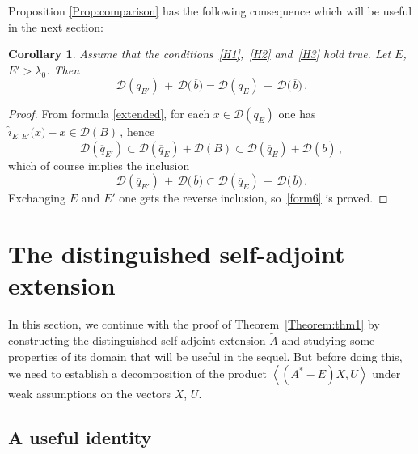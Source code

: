 \documentclass[12pt,reqno]{amsart}
\newtheorem{corollary}[theorem]{Corollary}\newtheorem{remark}[theorem]{Remark}
\newcommand{\innerproduct}[2]{\left\langle #1, #2 \right\rangle}
\newcommand{\be}[1]{\begin{equation}\label{#1}}
\newcommand{\ee}{\end{equation}}
\renewcommand{\(}{\left(}
\renewcommand{\)}{\right)}
\begin{document}
\noindent Proposition \ref{Prop:comparison} has the following consequence which will be useful in the next section:
\begin{corollary}\label{invariance}
Assume that the conditions~\eqref{H1},~\eqref{H2} and~\eqref{H3} hold true. Let $E$, $E'>\lambda_0$. Then
\be{form6}
\mathcal D(\overline{q}_{E'})\,+\, \mathcal D\big(\,\overline{b}\big) = \mathcal D(\overline{q}_E)\,+\, \mathcal D\big(\,\overline{b}\big)\,.
\ee
\end{corollary}
\begin{proof}

From formula \eqref{extended}, for each $x\in \mathcal D(\overline{q}_{E})$ one has $\hat{i}_{E,E'}\big(x) - x \in \mathcal D(B)\,$, hence
\[\mathcal D(\overline{q}_{E'})\subset
\mathcal D(\overline{q}_{E})+\mathcal D(B) \subset \mathcal D(\overline{q}_{E})+\mathcal D(\overline{b})\,,\]
which of course implies the inclusion
\[\mathcal D(\overline{q}_{E'})\,+\, \mathcal D\big(\,\overline{b}\big) \subset \mathcal D(\overline{q}_E)\,+\, \mathcal D\big(\,\overline{b}\big)\,.\]
Exchanging $E$ and $E'$ one gets the reverse inclusion, so~\eqref{form6} is proved.
\end{proof}


\section{The distinguished self-adjoint extension}\label{Section:mainproof}

In this section, we continue with the proof of Theorem~\ref{Theorem:thm1} by constructing the distinguished self-adjoint extension $\widetilde A$ and studying some properties of its domain that will be useful in the sequel. But before doing this, we need to establish a decomposition of the product $\innerproduct{(A^*-E)X}{U}$ under weak assumptions on the vectors $X$, $U$.

\subsection{A useful identity}\label{identity}
\end{document}
